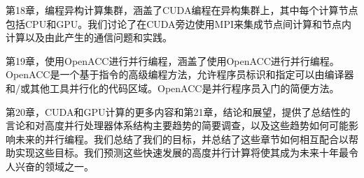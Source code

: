 \documentclass[11pt]{ctexart}
\begin{document}
第18章，编程异构计算集群，涵盖了CUDA编程在异构集群上，其中每个计算节点包括CPU和GPU。我们讨论了在CUDA旁边使用MPI来集成节点间计算和节点内计算以及由此产生的通信问题和实践。

第19章，使用OpenACC进行并行编程，涵盖了使用OpenACC进行并行编程。OpenACC是一个基于指令的高级编程方法，允许程序员标识和指定可以由编译器和/或其他工具并行化的代码区域。OpenACC是并行程序员入门的简便方法。

第20章，CUDA和GPU计算的更多内容和第21章，结论和展望，提供了总结性的言论和对高度并行处理器体系结构主要趋势的简要调查，以及这些趋势如何可能影响未来的并行编程。我们总结了我们的目标，并总结了这些章节如何相互配合以帮助实现这些目标。我们预测这些快速发展的高度并行计算将使其成为未来十年最令人兴奋的领域之一。
\end{document}
